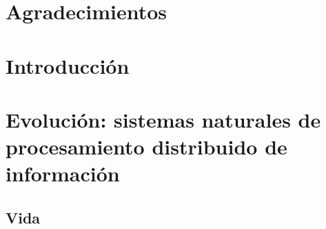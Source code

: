 \documentclass[a4paper,10pt]{book}
\makeatletter
\renewcommand{\mainmatter}{\cleardoublepage\@mainmattertrue}
\theoremstyle{definition}
\newif\ifen
\newif\ifes
\newcommand{\en}[1]{\ifen#1\fi}
\newcommand{\es}[1]{\ifes#1\fi}
\makeatother
\begin{document}
\chapter{Agradecimientos}

\chapter{Introducción}

\mainmatter



\chapter{Evolución: sistemas naturales de procesamiento distribuido de información} \label{ch:evo}


\section{Vida}

\en{In the last third of the history of the Universe, sometime around 4 billion years ago, a simple form of matter organization capable of self-replication appeared on Earth. }%
\es{En el último tercio de la historia del Universo, en algún momento hace aproximadamente 4000 millones de años, apareció en la tierra una forma de organización de la materia capaz de auto-replicarse. }%
%
\en{The growth of these lineages followed multiplicative and noisy processes: sequences of survival and reproduction rates. }%
\es{El crecimiento de estos linajes siguieron procesos multiplicativos y ruidosos: secuencias de tasas de supervivencia y reproducción. }%
%
\en{The errors produced during replication diversified the life forms, and the growth rates of the different strategies favored those better adapted to the environment. }%
\es{Los errores producidos durante la replicación diversificaron las formas de vida, y las diferentes tasas de crecimiento favorecieron a aquellas estrategias mejor adaptadas al ambiente. }%
%
\en{The current complexity of life is the consequence of a series of evolutionary transitions in which entities capable of self-replication after the transition become part of higher level cooperative units~\cite{maynardSmith1995-majorTransitions, szathmary1995-evolutionaryTransitions, szathmary2015-evolutionaryTransitions}. }%
\es{La complejidad actual de la vida es consecuencia de una serie de transiciones evolutivas en las que entidades capaces de autoreplicación luego de la transición pasan a formar parte de unidades cooperativas de nivel superior~\cite{maynardSmith1995-majorTransitions, szathmary1995-evolutionaryTransitions, szathmary2015-evolutionaryTransitions}. }%
\end{document}
